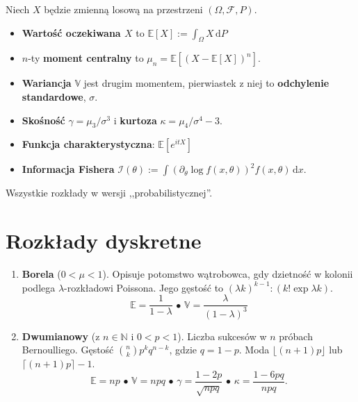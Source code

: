 \documentclass[a4paper, landscape]{extarticle}
\newcommand{\N}{\mathbb N}
\newcommand{\expected}{\mathbb{E}}
\newcommand{\variance}{\mathbb{V}}
\newenvironment{enumx}{\begin{enumerate} \setlength{\itemsep}{0pt} \setlength{\parskip}{0pt} \setlength{\parsep}{0pt}}{\end{enumerate}}
\newenvironment{itemx}{\begin{itemize} \setlength{\itemsep}{0pt} \setlength{\parskip}{0pt} \setlength{\parsep}{0pt}}{\end{itemize}}
\begin{document}
\setlength{\belowdisplayskip}{2pt}
\setlength{\belowdisplayshortskip}{2pt}
\setlength{\abovedisplayskip}{2pt}
\setlength{\abovedisplayshortskip}{2pt}


\renewcommand{\footrulewidth}{0.4pt}

\begin{multicols*}{3}
Niech $X$ będzie zmienną losową na przestrzeni $(\Omega, \mathcal F, P)$.
\begin{itemx}
\item \textbf{Wartość oczekiwana $X$} to $\expected[X] := \int_\Omega X\,\textrm{d}P$
\item $n$-ty \textbf{moment centralny} to $\mu_n=\expected[(X - \expected[X])^n]$.
\item \textbf{Wariancja} $\variance$ jest drugim momentem, pierwiastek z niej to \textbf{odchylenie standardowe}, $\sigma$.
\item \textbf{Skośność} $\gamma = \mu_3/\sigma^3$ i \textbf{kurtoza} $\kappa = \mu_4 / \sigma^4 -3$.
\item \textbf{Funkcja charakterystyczna}: $\expected[e^{itX}]$
\item \textbf{Informacja Fishera} $\mathcal I(\theta) := \int (\partial_\theta \log f(x, \theta))^2 f(x, \theta)\,\textrm{d}x$.
\end{itemx}

Wszystkie rozkłady w wersji ,,probabilistycznej''.

\section*{Rozkłady dyskretne}
\begin{enumx}
\item \textbf{Borela} ($0 < \mu < 1$).
	Opisuje potomstwo wątrobowca, gdy dzietność w kolonii podlega $\lambda$-rozkładowi Poissona.
	Jego gęstość to $(\lambda k)^{k-1} : (k! \exp \lambda k)$.
	\[
		\expected = \frac{1}{1 - \lambda} \,\bullet\,
		\variance = \frac{\lambda}{(1-\lambda)^3}%
	\]

\item \textbf{Dwumianowy} (z $n \in \N$ i $0 < p < 1$).
	Liczba sukcesów w $n$ próbach Bernoulliego.
	Gęstość ${n \choose k} p^k q^{n-k}$, gdzie	 $q = 1-p$.
	Moda $\lfloor (n+1)p\rfloor$ lub $\lceil (n+1)p \rceil -1$.
	\[
		\expected = np \,\bullet\,
		\variance = npq \,\bullet\,
		\gamma = \frac{1-2p}{\sqrt{npq}} \,\bullet\,
		\kappa = \frac{1-6pq}{npq}.
	\]


\end{enumx}
\end{multicols*}
\end{document}
